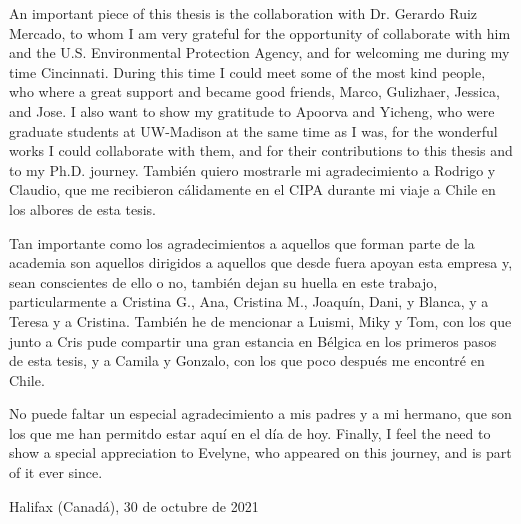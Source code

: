 An important piece of this thesis is the collaboration with Dr. Gerardo Ruiz Mercado, to whom I am very grateful for the opportunity of collaborate with him and the U.S. Environmental Protection Agency, and for welcoming me during my time Cincinnati. During this time I could meet some of the most kind people, who where a great support and became good friends, Marco, Gulizhaer, Jessica, and Jose. I also want to show my gratitude to Apoorva and Yicheng, who were graduate students at UW-Madison at the same time as I was, for the wonderful works I could collaborate with them, and for their contributions to this thesis and to my Ph.D. journey. También quiero mostrarle mi agradecimiento a Rodrigo y Claudio, que me recibieron cálidamente en el CIPA durante mi viaje a Chile en los albores de esta tesis. 

Tan importante como los agradecimientos a aquellos que forman parte de la academia son aquellos dirigidos a aquellos que desde fuera apoyan esta empresa y, sean conscientes de ello o no, tambi\'{e}n dejan su huella en este trabajo, particularmente a Cristina G., Ana, Cristina M., Joaquín, Dani, y Blanca, y a Teresa y a Cristina. También he de mencionar a Luismi, Miky y Tom, con los que junto a Cris pude compartir una gran estancia en Bélgica en los primeros pasos de esta tesis, y a Camila y Gonzalo, con los que poco despu\'{e}s me encontré en Chile. 

No puede faltar un especial agradecimiento a mis padres y a mi hermano, que son los que me han permitdo estar aquí en el día de hoy. Finally, I feel the need to show a special appreciation to Evelyne, who appeared on this journey, and is part of it ever since.

\bigskip

\hspace*{\fill} Halifax (Canadá), 30 de octubre de 2021

\endgroup
